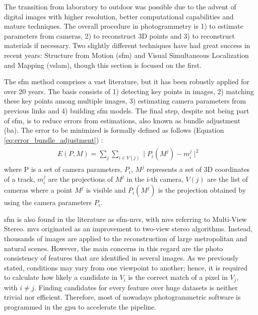 The transition from laboratory to outdoor was possible due to the advent of digital images with higher resolution, better computational capabilities and mature techniques. The overall procedure in photogrammetry is 1) to estimate parameters from cameras, 2) to reconstruct 3D points and 3) to reconstruct materials if necessary. Two slightly different techniques have had great success in recent years: Structure from Motion (\acrshort{sfm}) and Visual Simultaneous Localization and Mapping (\acrshort{vslam}), though this section is focused on the first. 

The \acrshort{sfm} method comprises a vast literature, but it has been robustly applied for over 20 years. The basis consists of 1) detecting key points in images, 2) matching these key points among multiple images, 3) estimating camera parameters from previous links and 4) building \acrshort{sfm} models. The final step, despite not being part of \acrshort{sfm}, is to reduce errors from estimations, also known as bundle adjustment (\acrshort{ba}). The error to be minimized is formally defined as follows (Equation \ref{eq:error_bundle_adjustment}) \cite{furukawa_multi-view_2015}:
\begin{gather}
    \label{eq:error_bundle_adjustment}
    \begin{aligned}
        E(P, M) = \sum_{j} \sum_{i \in V(j)} \mid P_i(M^j) - m_{i}^{j} \mid^2
    \end{aligned}
\end{gather}
where P is a set of camera parameters, ${P_i}$, $M^j$ represents a set of 3D coordinates of a track, $m_{i}^{j}$ are the projections of $M^j$ in the i-th camera, $V(j)$ are the list of cameras where a point $M^j$ is visible and $P_i(M^j)$ is the projection obtained by using the camera parameters $P_i$.

\acrshort{sfm} is also found in the literature as \acrshort{sfm}-\acrshort{mvs}, with \acrshort{mvs} referring to Multi-View Stereo. \acrshort{mvs} originated as an improvement to two-view stereo algorithms. Instead, thousands of images are applied to the reconstruction of large metropolitan and natural scenes. However, the main concerns in this regard are the photo consistency of features that are identified in several images. As we previously stated, conditions may vary from one viewpoint to another; hence, it is required to calculate how likely a candidate in $V_i$ is the correct match of a pixel in $V_j$, with $i \neq j$. Finding candidates for every feature over huge datasets is neither trivial nor efficient. Therefore, most of nowadays photogrammetric software is programmed in the \acrshort{gpu} to accelerate the pipeline.

